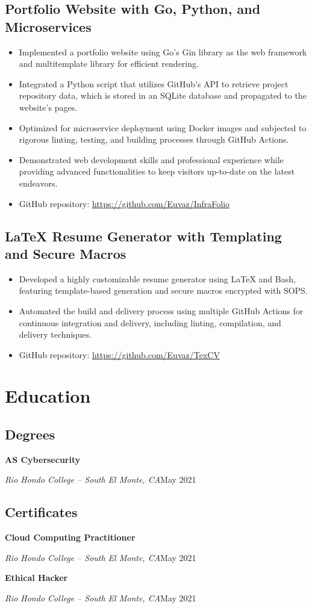 \documentclass[a4paper]{article}
\begin{document}
\subsection{Portfolio Website with Go, Python, and Microservices}
\begin{itemize}[noitemsep,nolistsep]
    \item Implemented a portfolio website using Go's Gin library as the web framework and multitemplate library for efficient rendering.
    \item Integrated a Python script that utilizes GitHub's API to retrieve project repository data, which is stored in an SQLite database and propagated to the website's pages.
    \item Optimized for microservice deployment using Docker images and subjected to rigorous linting, testing, and building processes through GitHub Actions.
    \item Demonstrated web development skills and professional experience while providing advanced functionalities to keep visitors up-to-date on the latest endeavors.
    \item GitHub repository: \url{https://github.com/Euvaz/InfraFolio}
\end{itemize}

\subsection{LaTeX Resume Generator with Templating and Secure Macros}
\begin{itemize}[noitemsep,nolistsep]
    \item Developed a highly customizable resume generator using LaTeX and Bash, featuring template-based generation and secure macros encrypted with SOPS\@.
    \item Automated the build and delivery process using multiple GitHub Actions for continuous integration and delivery, including linting, compilation, and delivery techniques.
    \item GitHub repository: \url{https://github.com/Euvaz/TexCV}
\end{itemize}

\section{Education}
\subsection{Degrees}
\textbf{AS Cybersecurity}\par
\textit{Rio Hondo College -- South El Monte, CA}\hfill May 2021

\subsection{Certificates}
\textbf{Cloud Computing Practitioner}\par
\textit{Rio Hondo College -- South El Monte, CA}\hfill May 2021

\textbf{Ethical Hacker}\par
\textit{Rio Hondo College -- South El Monte, CA}\hfill May 2021
\end{document}
